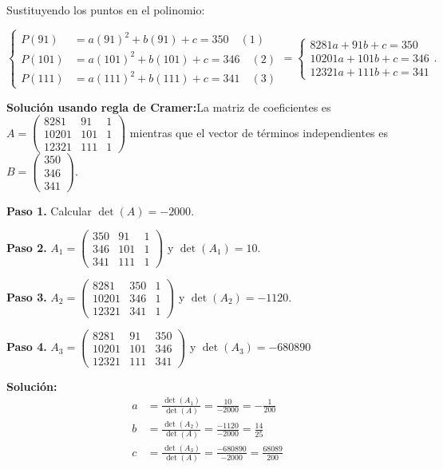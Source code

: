 \begin{prob}
\begin{myproof}
Sustituyendo los puntos en el polinomio: 

$\begin{cases}
P(91) &= a(91)^2 + b(91) + c = 350 \quad (1)\\
P(101) &= a(101)^2 + b(101) + c = 346 \quad (2)\\
P(111) &= a(111)^2 + b(111) + c = 341 \quad (3)
\end{cases}= \begin{cases} 8281a + 91b + c = 350\\
10201a + 101b + c = 346\\
12321a + 111b + c = 341
\end{cases}.$

\textbf{Solución usando regla de Cramer:}La matriz de coeficientes es \(
A = \begin{pmatrix}
8281 & 91 & 1 \\
10201 & 101 & 1 \\
12321 & 111 & 1
\end{pmatrix}
\) mientras que el vector de términos independientes es \(
B = \begin{pmatrix}
350 \\ 346 \\ 341
\end{pmatrix}.\)

\textbf{Paso 1.} Calcular $\det(A)= -2000.$

\textbf{Paso 2.} $A_1 = \begin{pmatrix}
350 & 91 & 1 \\
346 & 101 & 1 \\
341 & 111 & 1
\end{pmatrix}$ y $\det(A_1) = 10.$

\textbf{Paso 3.} $A_2 = \begin{pmatrix}
8281 & 350 & 1 \\
10201 & 346 & 1 \\
12321 & 341 & 1
\end{pmatrix}$ y $\det(A_2) = -1120.$

\textbf{Paso 4.} $A_3 = \begin{pmatrix}
8281 & 91 & 350 \\
10201 & 101 & 346 \\
12321 & 111 & 341
\end{pmatrix}$ y $\det(A_3) = -680890$

\textbf{Solución:}
\begin{align*}
a &= \frac{\det(A_1)}{\det(A)} = \frac{10}{-2000} = -\frac{1}{200} \\
b &= \frac{\det(A_2)}{\det(A)} = \frac{-1120}{-2000} = \frac{14}{25} \\
c &= \frac{\det(A_3)}{\det(A)} = \frac{-680890}{-2000} = \frac{68089}{200}
\end{align*}


\end{myproof}
\end{prob}
